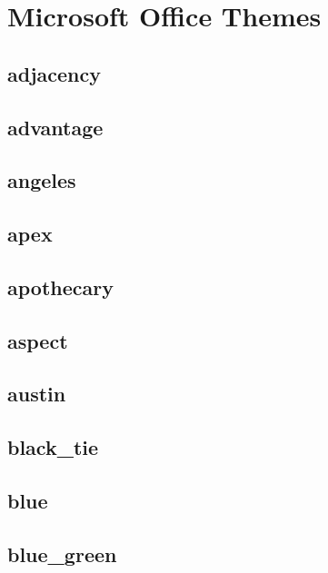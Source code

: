
\usepackage[scheme=office_2007_2010, dark]{./qocolours}


\begin{multicols}{2}
    \tableofcontents
\end{multicols}
\clearpage
{}
\leavevmode
\centering
\vspace{-1cm}
\section{Microsoft Office Themes}
\subsection{\ttfamily adjacency}
\newpage
\subsection{\ttfamily advantage}
\newpage
\subsection{\ttfamily angeles}
\newpage
\subsection{\ttfamily apex}
\newpage
\subsection{\ttfamily apothecary}
\newpage
\subsection{\ttfamily aspect}
\newpage
\subsection{\ttfamily austin}
\newpage
\subsection{\ttfamily black\_tie}
\newpage
\subsection{\ttfamily blue}
\newpage
\subsection{\ttfamily blue\_green}
\newpage
